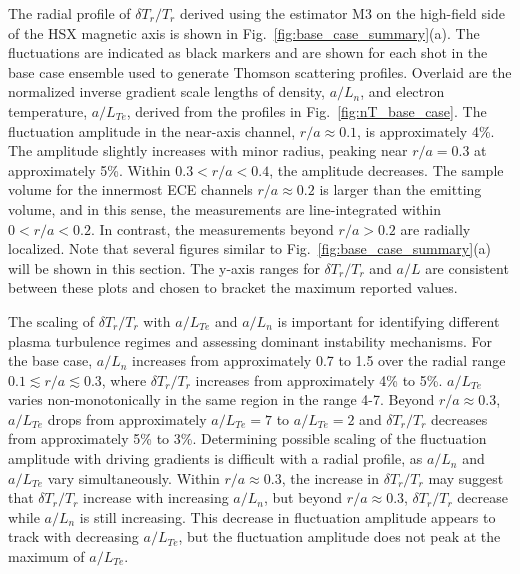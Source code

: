 \documentclass[%
 aip,
 amsmath,amssymb,
 reprint,%
]{revtex4-1}
\begin{document}
The radial profile of  $\delta T_r/T_r$  derived using the estimator M3 on the high-field side of the HSX magnetic axis is shown in Fig.\ \ref{fig:base_case_summary}(a). The fluctuations are indicated as black markers and are shown for each shot in the base case ensemble used to generate Thomson scattering profiles. Overlaid are the normalized inverse gradient scale lengths of density, $a/L_n$, and electron temperature, $a/L_{Te}$, derived from the profiles in Fig.\ \ref{fig:nT_base_case}. The fluctuation amplitude in the near-axis channel, $r/a\approx 0.1$, is approximately 4\%. The amplitude slightly increases with minor radius, peaking near $r/a=0.3$ at approximately 5\%. Within $0.3 < r/a < 0.4$, the amplitude decreases. The sample volume for the innermost ECE channels $r/a \approx 0.2$ is larger than the emitting volume, and in this sense, the measurements are line-integrated within $0 < r/a < 0.2$. In contrast, the measurements beyond $r/a > 0.2$ are radially localized. Note that several figures similar to Fig.\ \ref{fig:base_case_summary}(a) will be shown in this section. The y-axis ranges for $\delta T_r/T_r$ and $a/L$ are consistent between these plots and chosen to bracket the maximum reported values.

The scaling of $\delta T_r/T_r$ with $a/L_{Te}$ and $a/L_n$ is important for identifying different plasma turbulence regimes and assessing dominant instability mechanisms. For the base case, $a/L_n$ increases from approximately 0.7 to 1.5 over the radial range $0.1 \lesssim r/a \lesssim 0.3$, where $\delta T_r/T_r$  increases from approximately 4\% to 5\%. $a/L_{Te}$ varies non-monotonically in the same region in the range 4-7. Beyond $r/a\approx 0.3$, $a/L_{Te}$ drops from approximately $a/L_{Te}=7$ to $a/L_{Te}=2$ and $\delta T_r/T_r$ decreases from approximately 5\% to 3\%. Determining possible scaling of the fluctuation amplitude with driving gradients is difficult with a radial profile, as $a/L_n$ and $a/L_{Te}$ vary simultaneously. Within $r/a\approx0.3$, the increase in $\delta T_r/T_r$  may suggest that $\delta T_r/T_r$ increase with increasing $a/L_n$, but beyond $r/a\approx0.3$, $\delta T_r/T_r$ decrease while $a/L_n$ is still increasing. This decrease in fluctuation amplitude appears to track with decreasing $a/L_{Te}$, but the fluctuation amplitude does not peak at the maximum of $a/L_{Te}$.
\end{document}
